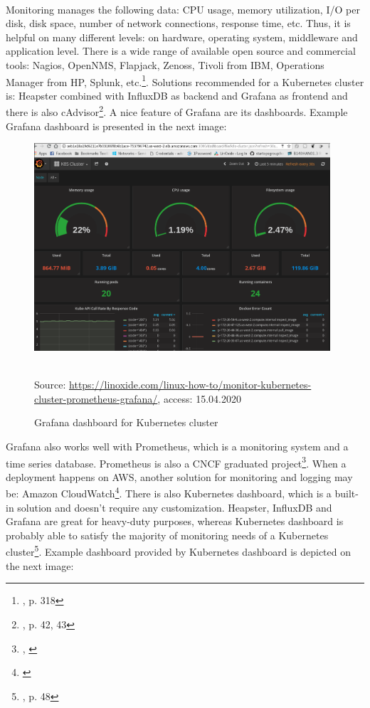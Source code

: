 \paragraph{}
Monitoring manages the following data: CPU usage, memory utilization, I/O per disk, disk space, number of network connections, response time, etc. Thus, it is helpful on many different levels: on hardware, operating system,  middleware and application level.
There is a wide range of available open source and commercial tools: Nagios, OpenNMS, Flapjack, Zenoss, Tivoli from IBM, Operations Manager from HP, Splunk, etc.\footnote{\cite{book-cicd}, p. 318}. Solutions recommended for a Kubernetes cluster is: Heapster combined with InfluxDB as backend and Grafana as frontend and there is also cAdvisor\footnote{\cite{book-mastering-k8s}, p. 42, 43}. A nice feature of Grafana are its dashboards. Example Grafana dashboard is presented in the next image:
\begin{figure}[H]
  \centering
  \includegraphics[width=11cm]{figures/grafana.png}
  \label{fig:grafana}
  \caption{Grafana dashboard for Kubernetes cluster}
  \\
  \tiny{Source: \url{https://linoxide.com/linux-how-to/monitor-kubernetes-cluster-prometheus-grafana/}, access: 15.04.2020}
\end{figure}
Grafana also works well with Prometheus, which is a monitoring system and a time series database. Prometheus is also a CNCF graduated project\footnote{\cite{online-prometheus-gh}, \cite{online-prometheus-www}}. When a deployment happens on AWS, another solution for monitoring and logging may be: Amazon CloudWatch\footnote{\cite{online-cw}}. There is also Kubernetes dashboard, which is a built-in solution and doesn't require any customization. Heapster, InfluxDB and Grafana are great for heavy-duty purposes, whereas Kubernetes dashboard is probably able to satisfy the majority of monitoring needs of a Kubernetes cluster\footnote{\cite{book-mastering-k8s}, p. 48}. Example dashboard provided by Kubernetes dashboard is depicted on the next image:
